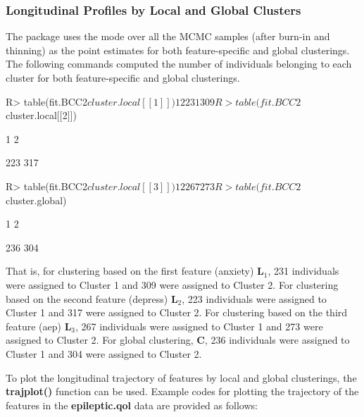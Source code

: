 \subsubsection{Longitudinal Profiles by Local and Global Clusters}

The package uses the mode over all the MCMC samples (after burn-in and thinning) as the point estimates for both feature-specific and global clusterings. The following commands computed the number of individuals belonging to each cluster for both feature-specific and global clusterings. 

\begin{example}

R> table(fit.BCC2$cluster.local[[1]])

  1   2 

231 309 

R> table(fit.BCC2$cluster.local[[2]])

  1   2 

223 317  

R> table(fit.BCC2$cluster.local[[3]])

  1   2 

267 273 

R> table(fit.BCC2$cluster.global)

  1   2 

236 304 

\end{example}

That is, for clustering based on the first feature (anxiety) $\boldsymbol{L}_1$, 231 individuals were assigned to Cluster 1 and 309 were assigned to Cluster 2. For clustering based on the second feature (depress) $\boldsymbol{L}_2$, 223 individuals were assigned to Cluster 1 and 317 were assigned to Cluster 2. For clustering based on the third feature (aep) $\boldsymbol{L}_3$, 267 individuals were assigned to Cluster 1 and 273 were assigned to Cluster 2. For global clustering, $\boldsymbol{C}$, 236 individuals were assigned to Cluster 1 and 304 were assigned to Cluster 2.

To plot the longitudinal trajectory of features by local and global clusterings, the \textbf{trajplot()} function can be used. Example codes for plotting the trajectory of the features in the \textbf{epileptic.qol} data are provided as follows: 

